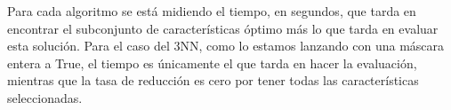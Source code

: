 \documentclass[12pt]{article}
\begin{document}
Para cada algoritmo se está midiendo el tiempo, en segundos, que tarda en encontrar el subconjunto de características óptimo más lo que tarda en evaluar esta solución. Para el caso del 3NN, como lo estamos lanzando con una máscara entera a True, el tiempo es únicamente el que tarda en hacer la evaluación, mientras que la tasa de reducción es cero por tener todas las características seleccionadas.

\begin{table}[H]
\centering
\caption{Resultados SFS}
\label{Resultados SFS}
\end{table}
\end{document}
